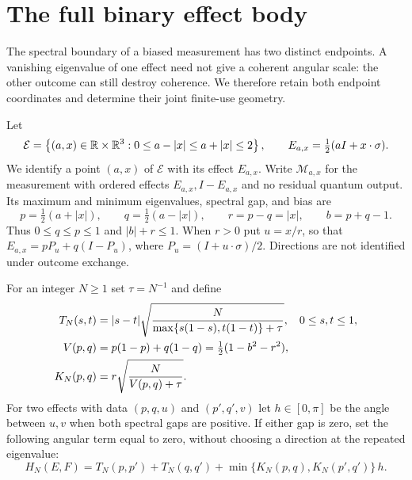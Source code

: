 \section{The full binary effect body}\label{sec:biasedmetric75}
The spectral boundary of a biased measurement has two distinct
endpoints.  A vanishing eigenvalue of one effect need not give a
coherent angular scale: the other outcome can still destroy coherence.
We therefore retain both endpoint coordinates and determine their
joint finite-use geometry.

Let
\begin{equation}\label{eq:biasedbody75}
 \mathcal E=\left\{(a,x)\in\mathbb R\times\mathbb R^3:
                   0\le a-|x|\le a+|x|\le2\right\},\qquad
 E_{a,x}=\tfrac12(aI+x\cdot\sigma).
\end{equation}
We identify a point $(a,x)$ of $\mathcal E$ with its effect $E_{a,x}$.
Write $\mathcal M_{a,x}$ for the measurement with ordered effects
$E_{a,x},I-E_{a,x}$ and no residual quantum output.  Its maximum and
minimum eigenvalues, spectral gap, and bias are
\[
 p=\tfrac12(a+|x|),\qquad q=\tfrac12(a-|x|),\qquad
 r=p-q=|x|,\qquad b=p+q-1.
\]
Thus $0\le q\le p\le1$ and $|b|+r\le1$.  When $r>0$ put
$u=x/r$, so that $E_{a,x}=pP_u+q(I-P_u)$, where
$P_u=(I+u\cdot\sigma)/2$.  Directions are not identified under
outcome exchange.

For an integer $N\ge1$ set $\tau=N^{-1}$ and define
\begin{align}
 T_N(s,t)&=|s-t|\sqrt{\frac{N}
                   {\max\{s(1-s),t(1-t)\}+\tau}},
                    &&0\le s,t\le1,\label{eq:spectralmodulus75}\\
 V(p,q)&=p(1-p)+q(1-q)=\tfrac12(1-b^2-r^2),\notag\\
 K_N(p,q)&=r\sqrt{\frac{N}{V(p,q)+\tau}}.
                                            \label{eq:biasedweight75}
\end{align}
For two effects with data $(p,q,u)$ and $(p',q',v)$ let
$h\in[0,\pi]$ be the angle between $u,v$ when both spectral gaps
are positive.  If either gap is zero, set the following angular term
equal to zero, without choosing a direction at the repeated eigenvalue:
\begin{equation}\label{eq:biasedcomparison75}
 H_N(E,F)=T_N(p,p')+T_N(q,q')
             +\min\{K_N(p,q),K_N(p',q')\}\,h.
\end{equation}

